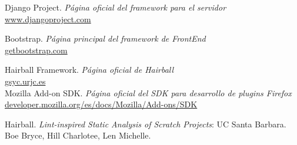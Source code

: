 \documentclass[a4paper, 12pt]{book}
\begin{document}
 \begin{thebibliography}{1}

   Django Project. {\em Página oficial del framework para el servidor} \\
	\url{www.djangoproject.com}

   Bootstrap. {\em Página principal del framework de FrontEnd} \\
	\url{getbootstrap.com}

   Hairball Framework. {\em Página oficial de Hairball}\\ 
	\url{gsyc.urjc.es} \\

	 Mozilla Add-on SDK. {\em Página oficial del SDK para desarrollo de 
	plugins Firefox} \\
	\url{developer.mozilla.org/es/docs/Mozilla/Add-ons/SDK}

   Hairball. {\em Lint-inspired Static Analysis of Scratch Projects}: UC Santa Barbara. Boe Bryce, Hill Charlotee, Len Michelle.

 \end{thebibliography}
\end{document}
